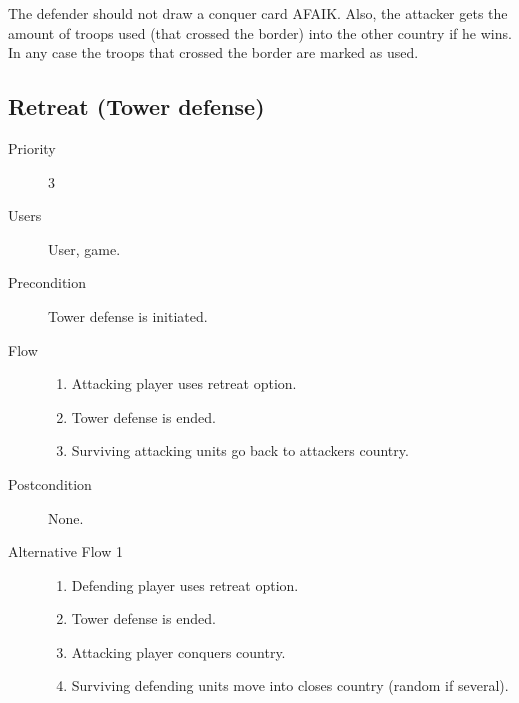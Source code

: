 \documentclass[12pt,a4paper]{article}
\begin{document}
\begin{todo}
  The defender should not draw a conquer card AFAIK. Also, the attacker
  gets the amount of troops used (that crossed the border) into the
  other country if he wins. In any case the troops that crossed the
  border are marked as used.
\end{todo}

\subsection{Retreat (Tower defense)}
\begin{description}
\item[Priority] 3
\item[Users] User, game.
\item[Precondition] Tower defense is initiated.
\item[Flow]\mbox{}
  \begin{enumerate}
  \item Attacking player uses retreat option.
  \item Tower defense is ended.
  \item Surviving attacking units go back to attackers country.
  \end{enumerate}
\item[Postcondition] None.
\item[Alternative Flow 1]\mbox{}
  \begin{enumerate}
  \item Defending player uses retreat option.
  \item Tower defense is ended.
  \item Attacking player conquers country.
  \item Surviving defending units move into closes country (random if several).
  \end{enumerate}
\end{description}
\end{document}

